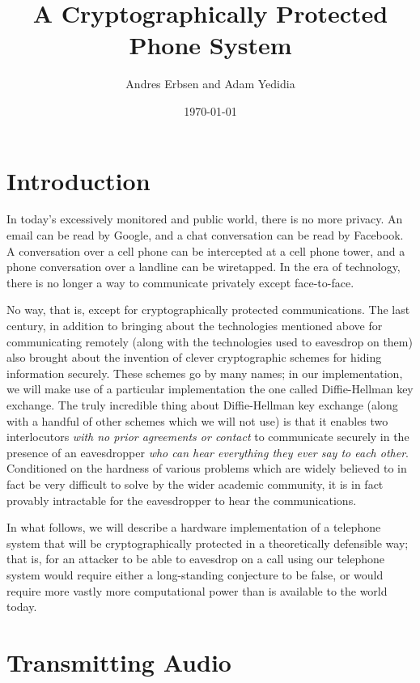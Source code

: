 \documentclass[a4paper]{article}
\title{A Cryptographically Protected Phone System}
\author{Andres Erbsen and Adam Yedidia}
\date{\today}
\begin{document}
\maketitle

\section{Introduction}

In today's excessively monitored and public world, there is no more privacy. An
email can be read by Google, and a chat conversation can be read by Facebook. A
conversation over a cell phone can be intercepted at a cell phone tower, and a
phone conversation over a landline can be wiretapped. In the era of technology,
there is no longer a way to communicate privately except face-to-face.

No way, that is, except for cryptographically protected communications. The last
century, in addition to bringing about the technologies mentioned above for
communicating remotely (along with the technologies used to eavesdrop on them)
also brought about the invention of clever cryptographic schemes for hiding
information securely. These schemes go by many names; in our implementation, we
will make use of a particular implementation the one called Diffie-Hellman key
exchange. The truly incredible thing about Diffie-Hellman key exchange (along
with a handful of other schemes which we will not use) is that it enables two
interlocutors \emph{with no prior agreements or contact} to communicate securely
in the presence of an eavesdropper \emph{who can hear everything they ever say
to each other}. Conditioned on the hardness of various problems which are widely
believed to in fact be very difficult to solve by the wider academic community,
it is in fact provably intractable for the eavesdropper to hear the
communications.

In what follows, we will describe a hardware implementation of a telephone
system that will be cryptographically protected in a theoretically defensible
way; that is, for an attacker to be able to eavesdrop on a call using our
telephone system would require either a long-standing conjecture to be false, or
would require more vastly more computational power than is available to the
world today.

\section{Transmitting Audio}
\end{document}

